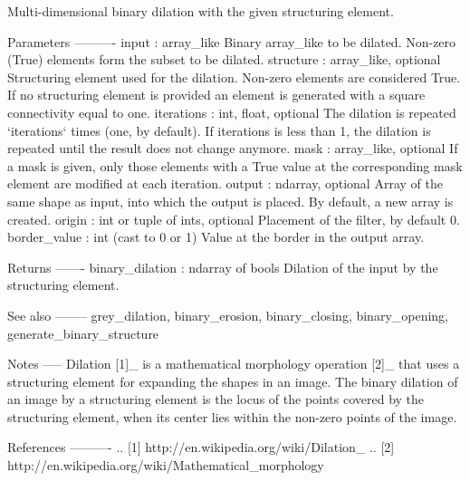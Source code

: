 \begin{DoxyVerb}Multi-dimensional binary dilation with the given structuring element.

Parameters
----------
input : array_like
    Binary array_like to be dilated. Non-zero (True) elements form
    the subset to be dilated.
structure : array_like, optional
    Structuring element used for the dilation. Non-zero elements are
    considered True. If no structuring element is provided an element
    is generated with a square connectivity equal to one.
iterations : {int, float}, optional
    The dilation is repeated `iterations` times (one, by default).
    If iterations is less than 1, the dilation is repeated until the
    result does not change anymore.
mask : array_like, optional
    If a mask is given, only those elements with a True value at
    the corresponding mask element are modified at each iteration.
output : ndarray, optional
    Array of the same shape as input, into which the output is placed.
    By default, a new array is created.
origin : int or tuple of ints, optional
    Placement of the filter, by default 0.
border_value : int (cast to 0 or 1)
    Value at the border in the output array.

Returns
-------
binary_dilation : ndarray of bools
    Dilation of the input by the structuring element.

See also
--------
grey_dilation, binary_erosion, binary_closing, binary_opening,
generate_binary_structure

Notes
-----
Dilation [1]_ is a mathematical morphology operation [2]_ that uses a
structuring element for expanding the shapes in an image. The binary
dilation of an image by a structuring element is the locus of the points
covered by the structuring element, when its center lies within the
non-zero points of the image.

References
----------
.. [1] http://en.wikipedia.org/wiki/Dilation_%
.. [2] http://en.wikipedia.org/wiki/Mathematical_morphology


\end{DoxyVerb}
